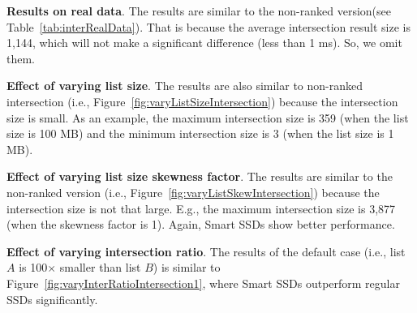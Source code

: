 \textbf{Results on real data}.
The results are similar to the non-ranked version(see Table~\ref{tab:interRealData}). That is because the average intersection result size is 1,144, which will not make a significant difference (less than 1 ms). So, we omit them.




\textbf{Effect of varying list size}.
The results are also similar to non-ranked intersection (i.e., Figure~\ref{fig:varyListSizeIntersection}) because the intersection size is small. As an example, the maximum intersection size is 359 (when the list size is 100 MB) and the minimum intersection size is 3 (when the list size is 1 MB).

\textbf{Effect of varying list size skewness factor}.
The results are similar to the non-ranked version (i.e., Figure~\ref{fig:varyListSkewIntersection}) because the intersection size is not that large. E.g., the maximum intersection size is 3,877 (when the skewness factor is 1). Again, Smart SSDs show better performance.

\textbf{Effect of varying intersection ratio}.
The results of the default case (i.e., list $A$ is 100$\times$ smaller than list $B$) is similar to Figure~\ref{fig:varyInterRatioIntersection1}, where Smart SSDs outperform regular SSDs significantly.


